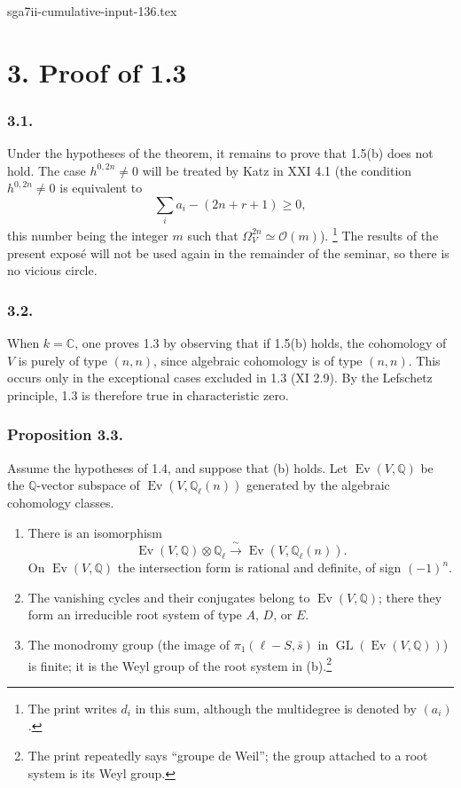 \begin{filecontents*}{sga7ii-cumulative-input-136.tex}
\section*{3. Proof of 1.3}

\subsubsection*{3.1.}
Under the hypotheses of the theorem, it remains to prove that 1.5(b) does
not hold.  The case $h^{0,2n}\ne0$ will be treated by Katz in XXI 4.1 (the
condition $h^{0,2n}\ne0$ is equivalent to
\[
  \sum_i a_i-(2n+r+1)\geq0,
\]
this number being the integer $m$ such that
$\Omega_V^{2n}\simeq\mathcal O(m)$).
\footnote{The print writes $d_i$ in this sum, although the multidegree is
denoted by $(a_i)$.}
The results of the present expos\'e will not be used again in the remainder
of the seminar, so there is no vicious circle.

\subsubsection*{3.2.}
When $k=\mathbb C$, one proves 1.3 by observing that if 1.5(b) holds, the
cohomology of $V$ is purely of type $(n,n)$, since algebraic cohomology is
of type $(n,n)$.  This occurs only in the exceptional cases excluded in
1.3 (XI 2.9).  By the Lefschetz principle, 1.3 is therefore true in
characteristic zero.

\subsubsection*{Proposition 3.3.}
Assume the hypotheses of 1.4, and suppose that (b) holds.  Let
$\operatorname{Ev}(V,\mathbb Q)$ be the $\mathbb Q$-vector subspace of
$\operatorname{Ev}(V,\mathbb Q_\ell(n))$ generated by the algebraic
cohomology classes.

\begin{enumerate}[label=(\alph*)]
\item There is an isomorphism
  \[
  \operatorname{Ev}(V,\mathbb Q)\otimes\mathbb Q_\ell
  \xrightarrow{\ \sim\ }
  \operatorname{Ev}(V,\mathbb Q_\ell(n)).
  \]
  On $\operatorname{Ev}(V,\mathbb Q)$ the intersection form is rational
  and definite, of sign $(-1)^n$.
\item The vanishing cycles and their conjugates belong to
  $\operatorname{Ev}(V,\mathbb Q)$; there they form an irreducible root
  system of type $A$, $D$, or $E$.
\item The monodromy group (the image of $\pi_1(\ell-S,\bar s)$ in
  $\operatorname{GL}(\operatorname{Ev}(V,\mathbb Q))$) is finite; it is the
  Weyl group of the root system in (b).\footnote{The print repeatedly says
  ``groupe de Weil''; the group attached to a root system is its Weyl
  group.}
\end{enumerate}


\end{filecontents*}
